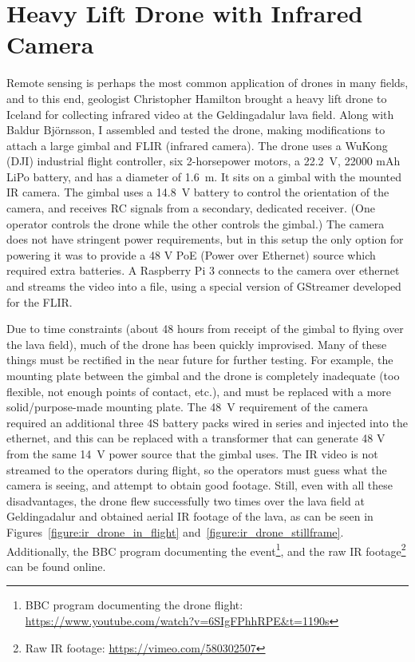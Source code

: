 \section{Heavy Lift Drone with Infrared Camera}
\label{section:ir_drone}

Remote sensing is perhaps the most common application of drones in many fields,
and to this end, geologist Christopher Hamilton brought a heavy lift drone to Iceland for collecting infrared video
at the Geldingadalur lava field.
Along with Baldur Björnsson, I assembled and tested the drone,
making modifications to attach a large gimbal and FLIR (infrared camera).
The drone uses a WuKong (DJI) industrial flight controller,
six 2-horsepower motors,
a 22.2~V, 22000 mAh LiPo battery,
and has a diameter of 1.6~m.
It sits on a gimbal with the mounted IR camera.
The gimbal uses a 14.8~V battery to control the orientation of the camera,
and receives RC signals from a secondary, dedicated receiver.
(One operator controls the drone while the other controls the gimbal.)
The camera does not have stringent power requirements,
but in this setup the only option for powering it was to provide
a 48 V PoE (Power over Ethernet) source which required extra batteries.
A Raspberry Pi 3 connects to the camera over ethernet and streams the video into a file,
using a special version of GStreamer developed for the FLIR.

Due to time constraints (about 48 hours from receipt of the gimbal
to flying over the lava field),
much of the drone has been quickly improvised.
Many of these things must be rectified in the near future for further testing.
For example, the mounting plate between the gimbal and the drone
is completely inadequate (too flexible, not enough points of contact, etc.),
and must be replaced with a more solid/purpose-made mounting plate.
The 48~V requirement of the camera required an additional three 4S battery packs
wired in series and injected into the ethernet,
and this can be replaced with a transformer that can generate 48 V
from the same 14~V power source that the gimbal uses.
The IR video is not streamed to the operators during flight,
so the operators must guess what the camera is seeing, and attempt to obtain good footage.
Still, even with all these disadvantages, the drone flew successfully two times
over the lava field at Geldingadalur and obtained aerial IR footage of the lava,
as can be seen in Figures~\ref{figure:ir_drone_in_flight} and~\ref{figure:ir_drone_stillframe}.
Additionally, the BBC program documenting the event\footnote{BBC program documenting the drone flight: \url{https://www.youtube.com/watch?v=6SIgFPhhRPE&t=1190s}}, and the raw IR footage\footnote{Raw IR footage: \url{https://vimeo.com/580302507}} can be found online.

